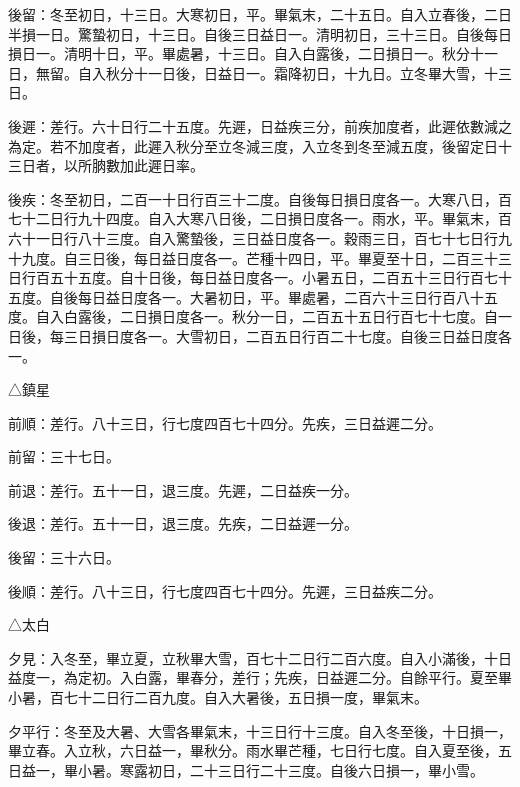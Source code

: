 \begin{pinyinscope}
 後留：冬至初日，十三日。大寒初日，平。畢氣末，二十五日。自入立春後，二日半損一日。驚蟄初日，十三日。自後三日益日一。清明初日，三十三日。自後每日損日一。清明十日，平。畢處暑，十三日。自入白露後，二日損日一。秋分十一日，無留。自入秋分十一日後，日益日一。霜降初日，十九日。立冬畢大雪，十三日。



 後遲：差行。六十日行二十五度。先遲，日益疾三分，前疾加度者，此遲依數減之為定。若不加度者，此遲入秋分至立冬減三度，入立冬到冬至減五度，後留定日十三日者，以所朒數加此遲日率。



 後疾：冬至初日，二百一十日行百三十二度。自後每日損日度各一。大寒八日，百七十二日行九十四度。自入大寒八日後，二日損日度各一。雨水，平。畢氣末，百六十一日行八十三度。自入驚蟄後，三日益日度各一。穀雨三日，百七十七日行九十九度。自三日後，每日益日度各一。芒種十四日，平。畢夏至十日，二百三十三日行百五十五度。自十日後，每日益日度各一。小暑五日，二百五十三日行百七十五度。自後每日益日度各一。大暑初日，平。畢處暑，二百六十三日行百八十五度。自入白露後，二日損日度各一。秋分一日，二百五十五日行百七十七度。自一日後，每三日損日度各一。大雪初日，二百五日行百二十七度。自後三日益日度各一。



 △鎮星



 前順：差行。八十三日，行七度四百七十四分。先疾，三日益遲二分。



 前留：三十七日。



 前退：差行。五十一日，退三度。先遲，二日益疾一分。



 後退：差行。五十一日，退三度。先疾，二日益遲一分。



 後留：三十六日。



 後順：差行。八十三日，行七度四百七十四分。先遲，三日益疾二分。



 △太白



 夕見：入冬至，畢立夏，立秋畢大雪，百七十二日行二百六度。自入小滿後，十日益度一，為定初。入白露，畢春分，差行；先疾，日益遲二分。自餘平行。夏至畢小暑，百七十二日行二百九度。自入大暑後，五日損一度，畢氣末。



 夕平行：冬至及大暑、大雪各畢氣末，十三日行十三度。自入冬至後，十日損一，畢立春。入立秋，六日益一，畢秋分。雨水畢芒種，七日行七度。自入夏至後，五日益一，畢小暑。寒露初日，二十三日行二十三度。自後六日損一，畢小雪。




\end{pinyinscope}
